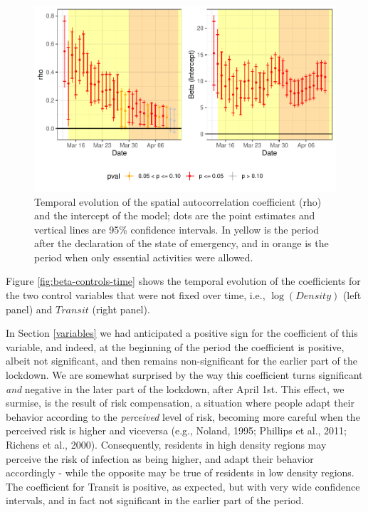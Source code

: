 \documentclass[]{elsarticle} %
\makeatletter
\def\maxwidth{\ifdim\Gin@nat@width>\linewidth\linewidth
\else\Gin@nat@width\fi}
\let\Oldincludegraphics\includegraphics
\renewcommand{\includegraphics}[1]{\Oldincludegraphics[width=\maxwidth]{#1}}
\makeatother
\begin{document}
\begin{figure}
\centering
\includegraphics{Environmental-Correlates-of-COVID19-Spain_files/figure-latex/results-time-1-1.pdf}
\caption{\label{fig:results-time-1}Temporal evolution of the spatial
autocorrelation coefficient (rho) and the intercept of the model; dots
are the point estimates and vertical lines are 95\% confidence
intervals. In yellow is the period after the declaration of the state of
emergency, and in orange is the period when only essential activities
were allowed.}
\end{figure}

Figure \ref{fig:beta-controls-time} shows the temporal evolution of the
coefficients for the two control variables that were not fixed over
time, i.e., \(\log(Density)\) (left panel) and \(Transit\) (right
panel).

In Section \ref{variables} we had anticipated a positive sign for the
coefficient of this variable, and indeed, at the beginning of the period
the coefficient is positive, albeit not significant, and then remains
non-significant for the earlier part of the lockdown. We are somewhat
surprised by the way this coefficient turns significant \emph{and}
negative in the later part of the lockdown, after April 1st. This
effect, we surmise, is the result of risk compensation, a situation
where people adapt their behavior according to the \emph{perceived}
level of risk, becoming more careful when the perceived risk is higher
and viceversa (e.g., Noland, 1995; Phillips et al., 2011; Richens et
al., 2000). Consequently, residents in high density regions may perceive
the risk of infection as being higher, and adapt their behavior
accordingly - while the opposite may be true of residents in low density
regions. The coefficient for Transit is positive, as expected, but with
very wide confidence intervals, and in fact not significant in the
earlier part of the period.
\end{document}
